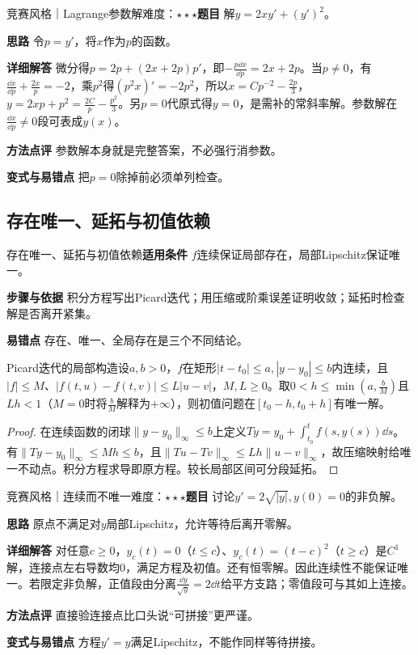 \begin{example}{竞赛风格｜Lagrange参数解}{难度：$\star\star\star$}\label{deep:ex:ode_source_deep:lagrange}\textbf{题目} 解$y=2xy'+(y')^2$。\par\textbf{思路} 令$p=y'$，将$x$作为$p$的函数。\par\textbf{详细解答} 微分得$p=2p+(2x+2p)p'$，即$-\frac{p\dd x}{\dd p}=2x+2p$。当$p\ne0$，有$\frac{\dd x}{\dd p}+\frac{2x}{p}=-2$，乘$p^2$得$(p^2x)'=-2p^2$，所以$x=Cp^{-2}-\frac{2p}{3}$，$y=2xp+p^2=\frac{2C}{p}-\frac{p^2}{3}$。另$p=0$代原式得$y=0$，是需补的常斜率解。参数解在$\frac{\dd x}{\dd p}\ne0$段可表成$y(x)$。\par\textbf{方法点评} 参数解本身就是完整答案，不必强行消参数。\par\textbf{变式与易错点} 把$p=0$除掉前必须单列检查。\end{example}

\subsection{存在唯一、延拓与初值依赖}\label{deep:ode_source_deep:exist}

\begin{method}{存在唯一、延拓与初值依赖}\textbf{适用条件} $f$连续保证局部存在，局部Lipschitz保证唯一。\par\textbf{步骤与依据} 积分方程写出Picard迭代；用压缩或阶乘误差证明收敛；延拓时检查解是否离开紧集。\par\textbf{易错点} 存在、唯一、全局存在是三个不同结论。\end{method}

\begin{theorem}{Picard迭代的局部构造}设$a,b>0$，$f$在矩形$|t-t_0|\le a,|y-y_0|\le b$内连续，且$|f|\le M$、$|f(t,u)-f(t,v)|\le L|u-v|$，$M,L\ge0$。取$0<h\le\min(a,\frac{b}{M})$且$Lh<1$（$M=0$时将$\frac{b}{M}$解释为$+\infty$），则初值问题在$[t_0-h,t_0+h]$有唯一解。\end{theorem}\begin{proof}在连续函数的闭球$\|y-y_0\|_\infty\le b$上定义$Ty=y_0+\int_{t_0}^tf(s,y(s))\dd s$。有$\|Ty-y_0\|_\infty\le Mh\le b$，且$\|Tu-Tv\|_\infty\le Lh\|u-v\|_\infty$，故压缩映射给唯一不动点。积分方程求导即原方程。较长局部区间可分段延拓。\end{proof}

\begin{example}{竞赛风格｜连续而不唯一}{难度：$\star\star\star$}\label{deep:ex:ode_source_deep:nonunique}\textbf{题目} 讨论$y'=2\sqrt{|y|},y(0)=0$的非负解。\par\textbf{思路} 原点不满足对$y$局部Lipschitz，允许等待后离开零解。\par\textbf{详细解答} 对任意$c\ge0$，$y_c(t)=0$（$t\le c$）、$y_c(t)=(t-c)^2$（$t\ge c$）是$C^1$解，连接点左右导数均0，满足方程及初值。还有恒零解。因此连续性不能保证唯一。若限定非负解，正值段由分离$\frac{\dd y}{\sqrt y}=2\dd t$给平方支路；零值段可与其如上连接。\par\textbf{方法点评} 直接验连接点比口头说“可拼接”更严谨。\par\textbf{变式与易错点} 方程$y'=y$满足Lipschitz，不能作同样等待拼接。\end{example}


